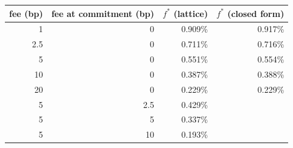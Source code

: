 \begin{tabular}{|r|r|r|r|}
\hline
\rowcolor{gray!15}fee (bp) & fee at commitment (bp) & $f^*$ (lattice) & $f^*$ (closed form) \\
\hline
1 & 0 & 0.909\% & 0.917\% \\
\hline
2.5 & 0 & 0.711\% & 0.716\% \\
\hline
5 & 0 & 0.551\% & 0.554\% \\
\hline
10 & 0 & 0.387\% & 0.388\% \\
\hline
20 & 0 & 0.229\% & 0.229\% \\
\hline
5 & 2.5 & 0.429\% &  \\
\hline
5 & 5 & 0.337\% &  \\
\hline
5 & 10 & 0.193\% &  \\
\hline
\end{tabular}
